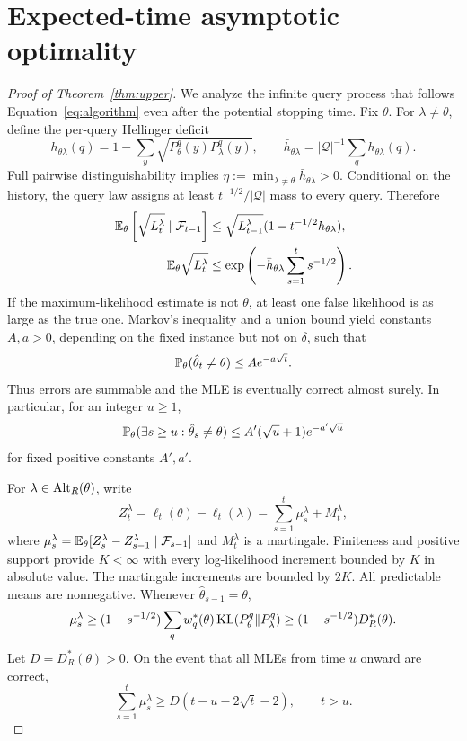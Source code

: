 \section{Expected-time asymptotic optimality}\label{app:upper}
\begin{proof}[Proof of Theorem~\ref{thm:upper}]
We analyze the infinite query process that follows Equation~\eqref{eq:algorithm} even after the potential stopping time. Fix $\theta$. For $\lambda\ne\theta$, define the per-query Hellinger deficit
\begin{equation}
h_{\theta\lambda}(q)=1-\sum_y\sqrt{P_\theta^q(y)P_\lambda^q(y)},\qquad
\bar h_{\theta\lambda}=|\mathcal Q|^{-1}\sum_qh_{\theta\lambda}(q).
\end{equation}
Full pairwise distinguishability implies $\eta:=\min_{\lambda\ne\theta}\bar h_{\theta\lambda}>0$. Conditional on the history, the query law assigns at least $t^{-1/2}/|\mathcal Q|$ mass to every query. Therefore
\begin{align}
\mathbb E_\theta\left[\sqrt{L_t^\lambda}\mid\mathcal F_{t-1}\right]
&\le\sqrt{L_{t-1}^\lambda}(1-t^{-1/2}\bar h_{\theta\lambda}),\\
\mathbb E_\theta\sqrt{L_t^\lambda}
&\le\exp\left(-\bar h_{\theta\lambda}\sum_{s=1}^t s^{-1/2}\right).
\end{align}
If the maximum-likelihood estimate is not $\theta$, at least one false likelihood is as large as the true one. Markov's inequality and a union bound yield constants $A,a>0$, depending on the fixed instance but not on $\delta$, such that
\begin{equation}
\mathbb P_\theta(\hat\theta_t\ne\theta)\le A e^{-a\sqrt t}. \label{eq:mletail}
\end{equation}
Thus errors are summable and the MLE is eventually correct almost surely. In particular, for an integer $u\ge1$,
\begin{equation}
\mathbb P_\theta(\exists s\ge u:\hat\theta_s\ne\theta)
\le A'(\sqrt u+1)e^{-a'\sqrt u} \label{eq:latemle}
\end{equation}
for fixed positive constants $A',a'$.

For $\lambda\in\operatorname{Alt}_R(\theta)$, write
\begin{equation}
Z_t^\lambda=\ell_t(\theta)-\ell_t(\lambda)
=\sum_{s=1}^t\mu_s^\lambda+M_t^\lambda,
\end{equation}
where $\mu_s^\lambda=\mathbb E_\theta[Z_s^\lambda-Z_{s-1}^\lambda\mid\mathcal F_{s-1}]$ and $M_t^\lambda$ is a martingale. Finiteness and positive support provide $K<\infty$ with every log-likelihood increment bounded by $K$ in absolute value. The martingale increments are bounded by $2K$. All predictable means are nonnegative. Whenever $\hat\theta_{s-1}=\theta$,
\begin{equation}
\mu_s^\lambda\ge(1-s^{-1/2})\sum_qw_q^*(\theta)\operatorname{KL}(P_\theta^q\Vert P_\lambda^q)
\ge(1-s^{-1/2})D_R^*(\theta).
\end{equation}
Let $D=D_R^*(\theta)>0$. On the event that all MLEs from time $u$ onward are correct,
\begin{equation}
\sum_{s=1}^t\mu_s^\lambda\ge D(t-u-2\sqrt t-2),\qquad t>u. \label{eq:drift}
\end{equation}


\end{proof}
